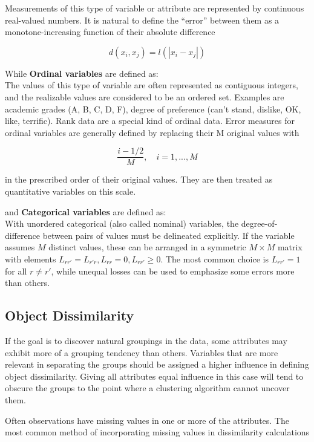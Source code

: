 Measurements of this type of variable or attribute
are represented by continuous real-valued numbers. It is natural to
define the “error” between them as a monotone-increasing function
of their absolute difference

\[
    d(x_i, x_j) = l(|x_i - x_j|)
\]

While \textbf{Ordinal variables} are defined as:\\

The values of this type of variable are often represented
as contiguous integers, and the realizable values are considered to be
an ordered set. Examples are academic grades (A, B, C, D, F), degree
of preference (can’t stand, dislike, OK, like, terrific). Rank data are a special kind of ordinal data. Error measures for ordinal variables are
generally defined by replacing their M original values with

\[
    \frac{i - 1/2}{M}, \quad i = 1,..., M
\]

in the prescribed order of their original values. They are then treated
as quantitative variables on this scale.

and \textbf{Categorical variables} are defined as:\\

With unordered categorical (also called nominal) variables, the degree-of-difference between pairs of values must be
delineated explicitly. If the variable assumes $M$ distinct values, these can be arranged in a symmetric $M \times M$ matrix with elements $L_{rr'} = L_{r'r}, L_{rr} = 0, L_{rr'} \geq 0$. The most common choice is $L_{rr'} = 1$ for all $r \neq r'$, while unequal losses can be used to emphasize some errors more than others.

\subsection{Object Dissimilarity}

If the goal is to discover natural groupings in the data, some attributes
may exhibit more of a grouping tendency than others. Variables that are
more relevant in separating the groups should be assigned a higher influence in defining object dissimilarity. Giving all attributes equal influence
in this case will tend to obscure the groups to the point where a clustering
algorithm cannot uncover them.

Often observations have missing values in one or more of the
attributes. The most common method of incorporating missing values in
dissimilarity calculations


